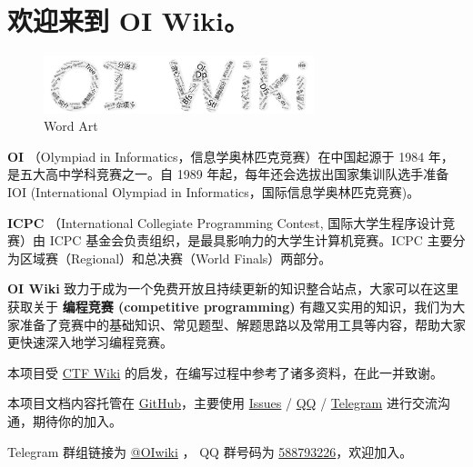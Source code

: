 
\section{欢迎来到 \textbf{OI Wiki}。}

\begin{figure}[htbp]
  \centering
  \includegraphics[width=0.7\textwidth]{docs/images/wordArt.png} 
  \caption{Word Art}
\end{figure}


\textbf{OI} （Olympiad in Informatics，信息学奥林匹克竞赛）在中国起源于 1984 年，是五大高中学科竞赛之一。自 1989 年起，每年还会选拔出国家集训队选手准备 IOI (International Olympiad in Informatics，国际信息学奥林匹克竞赛)。

\textbf{ICPC} （International Collegiate Programming Contest, 国际大学生程序设计竞赛）由 ICPC 基金会负责组织，是最具影响力的大学生计算机竞赛。ICPC 主要分为区域赛（Regional）和总决赛（World Finals）两部分。

\textbf{OI Wiki} 致力于成为一个免费开放且持续更新的知识整合站点，大家可以在这里获取关于 \textbf{编程竞赛 (competitive programming)} 有趣又实用的知识，我们为大家准备了竞赛中的基础知识、常见题型、解题思路以及常用工具等内容，帮助大家更快速深入地学习编程竞赛。

本项目受 \href{https://ctf-wiki.github.io/ctf-wiki/}{CTF Wiki} 的启发，在编写过程中参考了诸多资料，在此一并致谢。

本项目文档内容托管在 \href{https://github.com/24OI/OI-wiki}{GitHub}，主要使用 \href{https://github.com/24OI/OI-wiki/issues}{Issues} / \href{https://jq.qq.com/?_wv=1027&k=5EfkM6K}{QQ} / \href{https://t.me/OIwiki}{Telegram} 进行交流沟通，期待你的加入。

Telegram 群组链接为 \href{https://t.me/OIwiki}{@OIwiki} ， QQ 群号码为 \href{https://jq.qq.com/?_wv=1027&k=5EfkM6K}{588793226}，欢迎加入。
